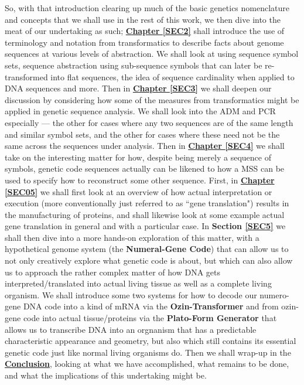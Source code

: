 \documentclass[a4paper, 18pt]{book} %
\begin{document}
So, with that introduction clearing up much of the basic genetics nomenclature and concepts that we shall use in the rest of this work, we then dive into the meat of our undertaking as such; \textbf{\hyperref[SEC2]{Chapter \ref{SEC2}}} shall introduce the use of terminology and notation from transformatics to describe facts about genome sequences at various levels of abstraction. We shall look at using sequence symbol sets, sequence abstraction using sub-sequence symbols that can later be re-transformed into flat sequences, the idea of sequence cardinality when applied to DNA sequences and more. Then in \textbf{\hyperref[SEC3]{Chapter \ref{SEC3}}} we shall deepen our discussion by considering how some of the measures from transformatics might be applied in genetic sequence analysis. We shall look into the ADM and PCR especially --- the other for cases where any two sequences are of the same length and similar symbol sets, and the other for cases where these need not be the same across the sequences under analysis. Then in \textbf{\hyperref[SEC4]{Chapter \ref{SEC4}}} we shall take on the interesting matter for how, despite being merely a sequence of symbols, genetic code sequences actually can be likened to how a MSS can be used to specify how to reconstruct some other sequence. First, in \textbf{\hyperref[SEC05]{Chapter \ref{SEC05}}} we shall first look at an overview of how actual interpretation or execution (more conventionally just referred to as ``gene translation") results in the manufacturing of proteins, and shall likewise look at some example actual gene translation in general and with a particular case. In \textbf{Section \ref{SEC5}} we shall then dive into a more hands-on exploration of this matter, with a hypothetical genome system (the \textbf{Numeral-Gene Code}) that can allow us to not only creatively explore what genetic code is about, but which can also allow us to approach the rather complex matter of how DNA gets interpreted/translated into actual living tissue as well as a complete living organism. We shall introduce some two systems for how to decode our numero-gene DNA code into a kind of mRNA via the \textbf{Ozin-Transformer} and from ozin-gene code into actual tissue/proteins via the \textbf{Plato-Form Generator} that allows us to transcribe DNA into an orgnanism that has a predictable characteristic appearance and geometry, but also which still contains its essential genetic code just like normal living organisms do. Then we shall wrap-up in the \textbf{\hyperref[CONC]{Conclusion}}, looking at what we have accomplished, what remains to be done, and what the implications of this undertaking might be.
\end{document}
